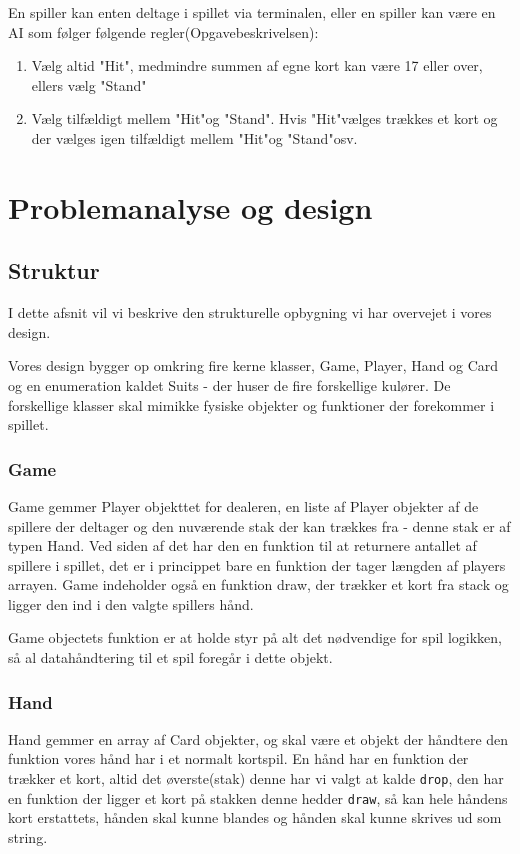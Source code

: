 \documentclass[a4paper]{article}
\begin{document}
      En spiller kan enten deltage i spillet via terminalen,
      eller en spiller kan være en AI som følger følgende regler(Opgavebeskrivelsen):
      \begin{enumerate}
        \item Vælg altid "Hit", medmindre summen af egne kort kan være 17 eller over, ellers vælg "Stand"
        \item Vælg tilfældigt mellem "Hit"og "Stand". Hvis "Hit"vælges trækkes et kort og der vælges igen tilfældigt mellem "Hit"og "Stand"osv.
      \end{enumerate}
  \newpage

  \section{Problemanalyse og design}
    \subsection*{Struktur}
      I dette afsnit vil vi beskrive den strukturelle opbygning vi har overvejet i vores design.

      Vores design bygger op omkring fire kerne klasser,
      Game, Player, Hand og Card og en enumeration kaldet Suits - der huser de fire forskellige kulører.
      De forskellige klasser skal mimikke fysiske objekter og funktioner der forekommer i spillet.

      \subsubsection*{Game}
      Game gemmer Player objekttet for dealeren, en liste af Player objekter af de spillere der deltager
      og den nuværende stak der kan trækkes fra - denne stak er af typen Hand.
      Ved siden af det har den en funktion til at returnere antallet af spillere i spillet,
      det er i princippet bare en funktion der tager længden af players arrayen.
      Game indeholder også en funktion draw, der trækker et kort fra stack og ligger den ind i den valgte spillers hånd.

      Game objectets funktion er at holde styr på alt det nødvendige for spil logikken,
      så al datahåndtering til et spil foregår i dette objekt.

      \subsubsection*{Hand}
      Hand gemmer en array af Card objekter, og skal være et objekt der håndtere den funktion vores hånd har i et normalt kortspil.
      En hånd har en funktion der trækker et kort, altid det øverste(stak) denne har vi valgt at kalde \lstinline$drop$,
      den har en funktion der ligger et kort på stakken denne hedder \lstinline$draw$,
      så kan hele håndens kort erstattets, hånden skal kunne blandes og hånden skal kunne skrives ud som string.
\end{document}

